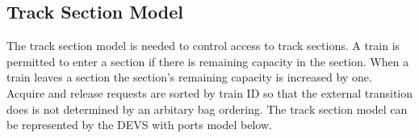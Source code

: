 \subsection{Track Section Model}

The track section model is needed to control access to track sections. A train
is permitted to enter a section if there is remaining capacity in the section.
When a train leaves a section the section's remaining capacity is increased by
one. Acquire and release requests are sorted by train ID so that the external
transition does is not determined by an arbitary bag ordering. The track 
section model can be represented by the DEVS with ports model below.

\newcommand{\InEnterReq}[0]{(\text{``Enter Request''}, \text{TrainID})}
\newcommand{\InExitReq}[1]{(\text{``Exit Request''}, \text{TrainID})}

\newcommand{\OutEnterRes}[1]{(\text{``Enter Response''}, #1)}

